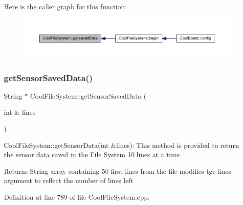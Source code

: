 Here is the caller graph for this function\+:\nopagebreak
\begin{figure}[H]
\begin{center}
\leavevmode
\includegraphics[width=350pt]{db/d0c/class_cool_file_system_a70701d05e811604af1b531f4f6dc69ed_icgraph}
\end{center}
\end{figure}
\mbox{\label{class_cool_file_system_a3223ffff4266a6300988fab956d6b4b2}} 
\subsubsection{\texorpdfstring{get\+Sensor\+Saved\+Data()}{getSensorSavedData()}}
{\footnotesize\ttfamily String $\ast$ Cool\+File\+System\+::get\+Sensor\+Saved\+Data (\begin{DoxyParamCaption}\item[{int \&}]{lines }\end{DoxyParamCaption})}

Cool\+File\+System\+::get\+Sensor\+Data(int \&lines)\+: This method is provided to return the sensor data saved in the File System 10 lines at a time

\begin{DoxyReturn}{Returns}
String array containing 50 first lines from the file modifies tge lines argument to reflect the number of lines left 
\end{DoxyReturn}


Definition at line 789 of file Cool\+File\+System.\+cpp.


